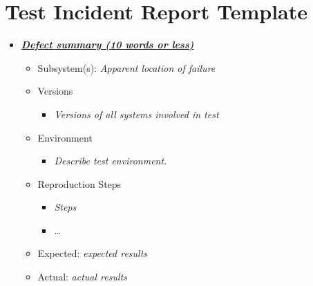 \documentclass[11pt]{wacomepd}
\begin{document}
\section{Test Incident Report Template}
\begin{itemize}
\item \textbf{\textit{\underline{Defect summary (10 words or less)}}}
  \begin{itemize}
  \item Subsystem(s): \textit{Apparent location of failure}
  \item Versions
    \begin{itemize} \item \textit{Versions of all systems involved in test} \end{itemize}
  \item Environment
    \begin{itemize} \item \textit{Describe test environment.} \end{itemize}
  \item Reproduction Steps
    \begin{itemize} \item \textit{Steps} \item \ldots \end{itemize}
  \item Expected: \textit{expected results}
  \item Actual: \textit{actual results}
  \end{itemize}
\end{itemize}







\end{document}
